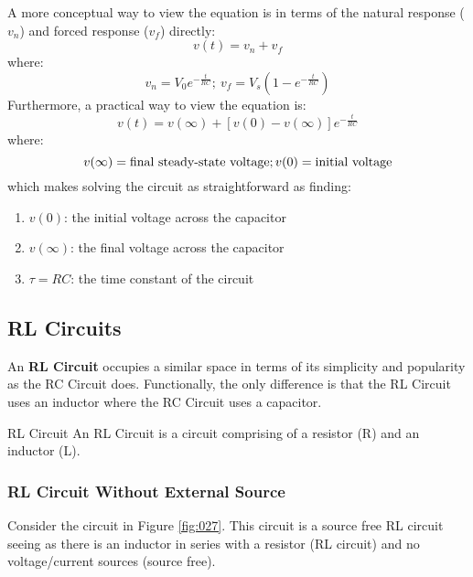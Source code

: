 \documentclass[12pt]{article}
\begin{document}
A more conceptual way to view the equation is in terms of the natural response ($v_n$) and forced response ($v_f$) directly:
\begin{equation*}
  v(t) = v_n + v_f
\end{equation*}
where:
\begin{equation*}
  v_n = V_0e^{-\frac{t}{RC}};\ v_f = V_s\left(1-e^{-\frac{t}{RC}}\right)
\end{equation*}
Furthermore, a practical way to view the equation is:
\begin{equation*}
  v(t) = v(\infty) + \left[ v(0) - v(\infty) \right]e^{-\frac{t}{RC}}
\end{equation*}
where:
\begin{equation*}
  v(\infty) = \textup{final steady-state voltage}; v(0) = \textup{initial voltage}
\end{equation*}
which makes solving the circuit as straightforward as finding:
\begin{enumerate}
  \itemsep0em
  \item $v(0)$: the initial voltage across the capacitor
  \item $v(\infty)$: the final voltage across the capacitor
  \item $\tau=RC$: the time constant of the circuit
\end{enumerate}

\subsection{RL Circuits}
\label{ssec:rlCircuits}

An \textbf{RL Circuit} occupies a similar space in terms of its simplicity and popularity as the RC Circuit does. Functionally, the only difference is that the RL Circuit uses an inductor where the RC Circuit uses a capacitor.

\begin{definition}{RL Circuit}
  An RL Circuit is a circuit comprising of a resistor (R) and an inductor (L).
\end{definition}

\subsubsection{RL Circuit Without External Source}
\label{sssec:rlCircuitWithoutExternalSource}

Consider the circuit in Figure \ref{fig:027}. This circuit is a source free RL circuit seeing as there is an inductor in series with a resistor (RL circuit) and no voltage/current sources (source free).
\end{document}
